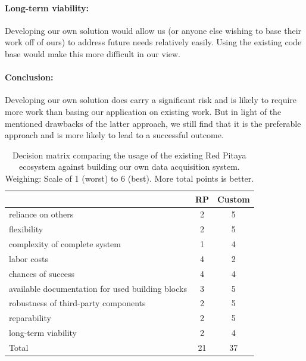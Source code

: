 \paragraph{Long-term viability:} Developing  our own  solution would  allow us
(or anyone  else wishing  to base their  work off of  ours) to  address future
needs relatively  easily. Using the  existing code base  would make  this more
difficult in our view.

\paragraph{Conclusion:} Developing our  own solution does carry  a significant
risk  and is  likely  to require  more  work than  basing  our application  on
existing  work.   But in  light  of  the  mentioned  drawbacks of  the  latter
approach, we still find that it is  the preferable approach and is more likely
to lead to a successful outcome.


\begin{table}
    \centering
    \caption{%
        Decision   matrix   comparing   the   usage  of   the   existing   Red
        Pitaya   ecosystem  against   building   our   own  data   acquisition
        system. Weighing: Scale  of \num{1}  (worst)  to \num{6}  (best). More
        total points is better.%
    }
    \label{tab:decision_matrix:pitaya_vs_own}
    \begin{tabular}{>{\raggedright}p{80mm}SS}
        \toprule
        & RP & Custom \\
        \midrule
        reliance on others &
        2 & 5 \\

        flexibility &
        2 & 5 \\

        complexity of complete system &
        1 & 4 \\

        labor costs &
        4 & 2 \\

        chances of success &
        4 & 4 \\

        available documentation for used building blocks &
        3 & 5 \\

        robustness of third-party components &
        2 & 5 \\

        reparability &
        2 & 5 \\

        long-term viability&
        2 & 4 \\
        \midrule
        Total & 21 & 37 \\
        \bottomrule
    \end{tabular}
\end{table}

